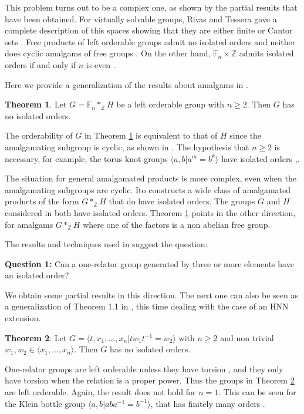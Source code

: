 \documentclass[12pt]{article}
\newcommand{\F}{\mathbb{F}}
\newcommand{\Z}{\mathbb Z}
\theoremstyle{definition}
\newtheorem{thm}{Theorem}[section]
\newcommand{\vs}{\vspace{0.3cm}}
\begin{document}
This problem turns out to be a complex one, as shown by the partial results that have been obtained. For virtually solvable groups, Rivas and Tessera gave a complete description of this spaces showing that they are either finite or Cantor sets \cite{rivas tessera}. Free products of left orderable groups admit no isolated orders \cite{rivas_free} and neither does cyclic amalgams of free groups \cite{abr}. On the other hand, $\F_n\times\Z$ admits isolated orders if and only if $n$ is even \cite{ping}. 

Here we provide a generalization of the results about amalgams in \cite{abr}.      

\begin{thm}\label{manija} Let $G=\F_n*_{\Z}H$ be a left orderable group with $n\geq 2$. Then $G$ has no isolated orders. 
\end{thm}

The orderability of $G$ in Theorem \ref{manija} is equivalent to that of $H$ since the amalgamating subgroup is cyclic, as shown in \cite{BG camb}. The hypothesis that $n\geq 2$ is necessary, for example, the torus knot groups $\langle a,b|a^m=b^k\rangle$ have isolated orders \cite{navas},\cite{ito}. 

The situation for general amalgamated products is more complex, even when the amalgamating subgroups are cyclic. Ito \cite{ito2} constructs a wide class of amalgamated products of the form $G*_{\Z}H$ that do have isolated orders. The groups $G$ and $H$ considered in \cite{ito2} both have isolated orders. Theorem \ref{manija} points in the other direction, for amalgams $G*_{\Z}H$ where one of the factors is a non abelian free group.  

The results and techniques used in \cite{abr} suggest the question:

\vs
{\bf Question 1:} Can a one-relator group generated by three or more elements have an isolated order?
\vs 
  
  
We obtain some partial results in this direction. The next one can also be seen as a generalization of Theorem 1.1 in \cite{abr}, this time dealing with the case of an HNN extension.

\begin{thm}\label{hnn} Let $G=\langle t,x_1,...,x_n|tw_1t^{-1}=w_2\rangle$ with $n\geq 2$ and non trivial $w_1,w_2\in \langle x_1,...,x_n \rangle$. Then $G$ has no isolated orders. 
\end{thm}

One-relator groups are left orderable unless they have torsion \cite{brodskii}, and they only have torsion when the relation is a proper power. Thus the groups in Theorem \ref{hnn} are left orderable. Again, the result does not hold for $n=1$. This can be seen for the Klein bottle group $\langle a,b|aba^{-1}=b^{-1}\rangle$, that has finitely many orders \cite{GOD}. 
\end{document}
